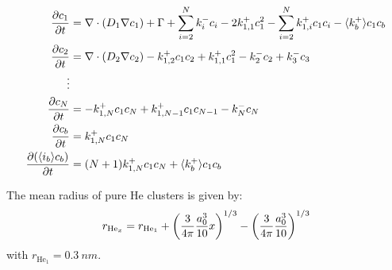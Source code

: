 \begin{subequations}
    \begin{align}
        \frac{\partial c_1}{\partial t} &= \nabla \cdot (D_1 \nabla c_1) + \Gamma + \sum\limits_{i=2}^N k_{i}^- c_i- 2k_{1, 1}^+ c_1^2 - \sum\limits_{i=2}^N k_{1,i}^+ c_1 c_i - \langle k_b^+ \rangle c_1 c_b \\
        \frac{\partial c_2}{\partial t} &= \nabla \cdot (D_2 \nabla c_2) - k_{1, 2}^+ c_1 c_2 + k_{1, 1}^+ c_1^2 - k_{2}^- c_2 + k_{3}^- c_3\\
        \vdots \nonumber\\
        \frac{\partial c_N}{\partial t} &= - k_{1, N}^+ c_1 c_N + k_{1, N-1}^+ c_1 c_{N-1} - k_{N}^- c_N\\
        \frac{\partial c_b}{\partial t} &= k_ {1,N}^+ c_1 c_N \\
        \frac{\partial (\langle i_b \rangle c_b)}{\partial t} &= (N+1)k_ {1,N}^+ c_1 c_N  + \langle k_b^+ \rangle c_1 c_b
    \end{align}
    \labeq{temporal evolution grouping}
\end{subequations}

The mean radius of pure He clusters  is given by:
\begin{equation}
    r_{\mathrm{He}_x} = r_{\mathrm{He}_1} + \left(\frac{3}{4\pi} \frac{a_0^3}{10} x \right)^{1/3} - \left( \frac{3}{4\pi} \frac{a_0^3}{10} \right)^{1/3}
    \labeq{radius pure He}
\end{equation}
with $r_{\mathrm{He}_1} = \SI{0.3}{nm}$.

